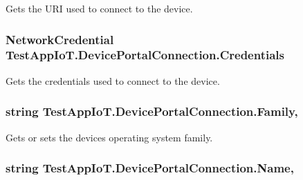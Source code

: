 Gets the U\+RI used to connect to the device. 

\subsubsection[{\texorpdfstring{Credentials}{Credentials}}]{\setlength{\rightskip}{0pt plus 5cm}Network\+Credential Test\+App\+Io\+T.\+Device\+Portal\+Connection.\+Credentials\hspace{0.3cm}{\ttfamily [get]}}\hypertarget{class_test_app_io_t_1_1_device_portal_connection_a2b86a1f529b5b2ad8229c6f737547e90}{}\label{class_test_app_io_t_1_1_device_portal_connection_a2b86a1f529b5b2ad8229c6f737547e90}


Gets the credentials used to connect to the device. 

\subsubsection[{\texorpdfstring{Family}{Family}}]{\setlength{\rightskip}{0pt plus 5cm}string Test\+App\+Io\+T.\+Device\+Portal\+Connection.\+Family\hspace{0.3cm}{\ttfamily [get]}, {\ttfamily [set]}}\hypertarget{class_test_app_io_t_1_1_device_portal_connection_a74897194477fa27dccfe5750439726e9}{}\label{class_test_app_io_t_1_1_device_portal_connection_a74897194477fa27dccfe5750439726e9}


Gets or sets the device\textquotesingle{}s operating system family. 

\subsubsection[{\texorpdfstring{Name}{Name}}]{\setlength{\rightskip}{0pt plus 5cm}string Test\+App\+Io\+T.\+Device\+Portal\+Connection.\+Name\hspace{0.3cm}{\ttfamily [get]}, {\ttfamily [set]}}\hypertarget{class_test_app_io_t_1_1_device_portal_connection_a943e261fc9da65f393dc785375c3a041}{}\label{class_test_app_io_t_1_1_device_portal_connection_a943e261fc9da65f393dc785375c3a041}


